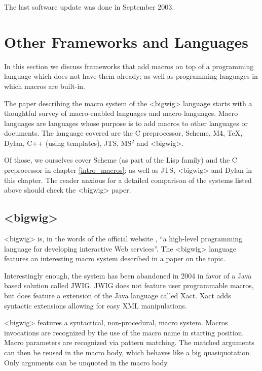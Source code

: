 The last software update was done in September 2003.

\section{Other Frameworks and Languages}

In this section we discuss frameworks that add macros on top of a programming
language which does not have them already; as well as programming languages in
which macros are built-in.

The paper describing the macro system of the <bigwig> language
\cite{bigwig_paper} starts with a thoughtful survey of macro-enabled languages
and macro languages. Macro languages are languages whose purpose is to add
macros to other languages or documents. The language covered are the C
preprocessor, Scheme, M4, \TeX{}, Dylan, C++ (using templates), JTS, MS$^2$ and
<bigwig>.

Of those, we ourselves cover Scheme (as part of the Lisp family) and the C
preprocessor in chapter \ref{intro_macros}; as well as JTS, <bigwig> and Dylan
in this chapter. The reader anxious for a detailed comparison of the systems
listed above should check the <bigwig> paper. \cite{bigwig_paper}

\subsection{<bigwig>}

<bigwig> is, in the words of the official website \cite{bigwig}, ``a high-level
programming language for developing interactive Web services''. The <bigwig>
language features an interesting macro system described in a paper on the
topic. \cite{bigwig_paper}

Interestingly enough, the system has been abandoned in 2004 in favor of a Java
based solution called JWIG. JWIG does not feature user programmable macros, but
does feature a extension of the Java language called Xact. Xact adds syntactic
extensions allowing for easy XML manipulations.

<bigwig> features a syntactical, non-procedural, macro system. Macros
invocations are recognized by the use of the macro name in starting
position. Macro parameters are recognized via pattern matching. The matched
arguments can then be reused in the macro body, which behaves like a big
quasiquotation. Only arguments can be unquoted in the macro body.

